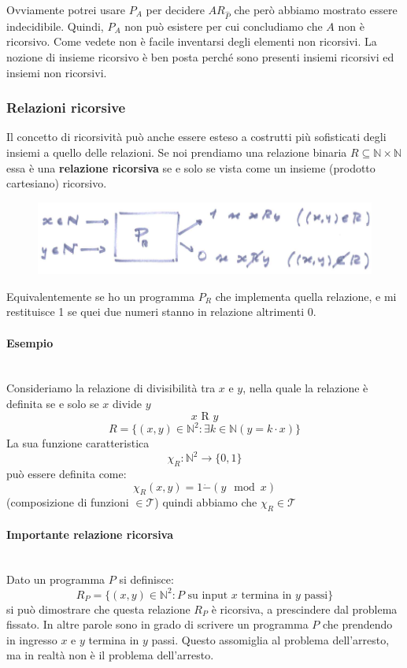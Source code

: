 \documentclass{article}
\begin{document}
Ovviamente potrei usare $P_A$ per decidere $AR_{\hat{P}}$ che però abbiamo mostrato
essere indecidibile. Quindi, $P_A$ non può esistere per cui concludiamo che $A$ non è
ricorsivo.
Come vedete non è facile inventarsi degli elementi non ricorsivi. La nozione di insieme
ricorsivo è ben posta perché sono presenti insiemi ricorsivi ed insiemi non ricorsivi.

\subsubsection{Relazioni ricorsive}
Il concetto di ricorsività può anche essere esteso a costrutti più sofisticati degli
insiemi a quello delle relazioni. Se noi prendiamo una relazione binaria $R\subseteq\mathbb{N}\times\mathbb{N}$
essa è una \textbf{relazione ricorsiva} se e solo se vista come un insieme (prodotto cartesiano) ricorsivo.
\begin{figure}[H]
    \centering
    \includegraphics[scale=0.5]{images/rel_ricors.png}
\end{figure}
Equivalentemente se ho un programma $P_R$ che implementa quella relazione, e mi restituisce
1 se quei due numeri stanno in relazione altrimenti 0.
\paragraph{Esempio}\mbox{}\\
Consideriamo la relazione di divisibilità tra $x$ e $y$, nella quale la relazione
è definita se e solo se $x$ divide $y$
$$x\text{ R }y$$
$$R=\{(x,y)\in\mathbb{N}^2:\exists k\in\mathbb{N}(y=k\cdot x)\}$$
La sua funzione caratteristica
$$\chi_R:\mathbb{N}^2\rightarrow \{0,1\}$$
può essere definita come:
$$\chi_R(x,y)=1\dot{-}(y\mod x)$$
(composizione di funzioni $\in\mathcal{T}$)
quindi abbiamo che $\chi_R\in\mathcal{T}$

\paragraph{Importante relazione ricorsiva}\mbox{}\\
Dato un programma $P$ si definisce:
$$R_P=\{(x,y)\in\mathbb{N}^2:P\text{ su input }x\text{ termina in }y\text{ passi}\}$$
si può dimostrare che questa relazione $R_P$ è ricorsiva, a prescindere dal
problema fissato. In altre parole sono in grado di scrivere un programma $P$ che prendendo
in ingresso $x$ e $y$ termina in $y$ passi. Questo assomiglia al problema dell'arresto,
ma in realtà non è il problema dell'arresto.
\end{document}
